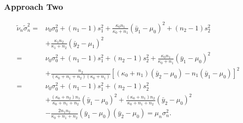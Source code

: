 \documentclass[compress]{beamer}
\begin{document}
\begin{frame}
\frametitle{Approach Two}
\begin{align*}
\tilde{\nu}_n\tilde{\sigma}^2_n  = &\nu_0\sigma_0^2+(n_1-1)s_1^2+\frac{\kappa_0 n_1}{\kappa_0 +n_1}(\bar{y}_1-\mu_0)^2+(n_2-1)s_2^2\\
&+\frac{\kappa_1 n_2}{\kappa_1 +n_2}(\bar{y}_2-\mu_1)^2\\
=& \nu_0\sigma_0^2+(n_1-1)s_1^2+(n_2-1)s_2^2+\frac{\kappa_0 n_1}{\kappa_0 +n_1}(\bar{y}_1-\mu_0)^2\\
&+\frac{n_2}{(\kappa_0+n_1+n_2)(\kappa_0+n_1)}[(\kappa_0+n_1)(\bar{y}_2-\mu_0)-n_1(\bar{y}_1-\mu_0)]^2\\
 =& \nu_0\sigma_0^2+(n_1-1)s_1^2+(n_2-1)s_2^2\\
&+\frac{(\kappa_0+n_2)n_1}{\kappa_0+n_1+n_2}(\bar{y}_1-\mu_0)^2+\frac{(\kappa_0+n_1)n_2}{\kappa_0+n_1+n_2}(\bar{y}_2-\mu_0)^2\\
&-\frac{2n_1n_2}{\kappa_0+n_1+n_2}(\bar{y}_1-\mu_0)(\bar{y}_2-\mu_0)=\mu_n\sigma^2_n.
\end{align*}
\end{frame}
\end{document}
